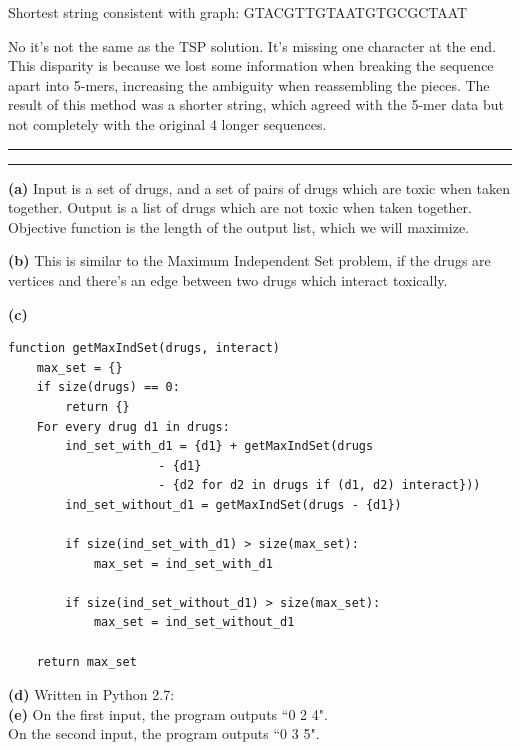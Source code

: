 \documentclass[11pt,letterpaper]{article}
\newcommand{\question}[1] {\vspace{.25in} \hrule\vspace{0.5em}
\noindent{\bf #1} \vspace{0.5em}
\hrule \vspace{.10in}}
\renewcommand{\part}[1] {\vspace{.10in} {\bf (#1)}}
\begin{document}
Shortest string consistent with graph: GTACGTTGTAATGTGCGCTAAT

No it's not the same as the TSP solution. It's missing one character at the end.
This disparity is because we lost some information when breaking the sequence apart into 5-mers, increasing the ambiguity when reassembling the pieces.
The result of this method was a shorter string, which agreed with the 5-mer data but not completely with the original 4 longer sequences.

\question{4}
\part{a}
Input is a set of drugs, and a set of pairs of drugs which are toxic when taken together.
Output is a list of drugs which are not toxic when taken together.
Objective function is the length of the output list, which we will maximize.

\part{b}
This is similar to the Maximum Independent Set problem, if the drugs are vertices and there's an edge between two drugs which interact toxically.

\part{c}

\begin{verbatim}
function getMaxIndSet(drugs, interact)
    max_set = {}
    if size(drugs) == 0:
        return {}
    For every drug d1 in drugs:
        ind_set_with_d1 = {d1} + getMaxIndSet(drugs
                     - {d1}
                     - {d2 for d2 in drugs if (d1, d2) interact}))
        ind_set_without_d1 = getMaxIndSet(drugs - {d1})

        if size(ind_set_with_d1) > size(max_set):
            max_set = ind_set_with_d1

        if size(ind_set_without_d1) > size(max_set):
            max_set = ind_set_without_d1

    return max_set
\end{verbatim}

\part{d}
Written in Python 2.7:\\


\part{e}
On the first input, the program outputs ``0 2 4".\\
On the second input, the program outputs ``0 3 5".\\
\end{document}
